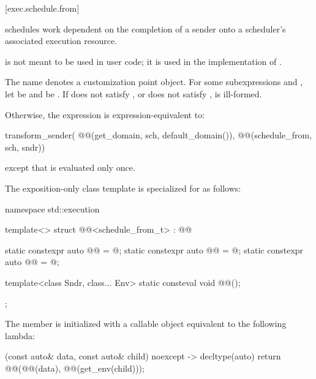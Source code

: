 [exec.schedule.from]{}

\pnum
{} schedules work dependent on the completion of a sender
onto a scheduler's associated execution resource.
\begin{note}
 is not meant to be used in user code;
it is used in the implementation of .
\end{note}

\pnum
The name  denotes a customization point object.
For some subexpressions  and ,
let  be  and
 be .
If  does not satisfy , or
 does not satisfy ,
 is ill-formed.

\pnum
Otherwise,
the expression  is expression-equivalent to:
\begin{codeblock}
transform_sender(
  @@(get_domain, sch, default_domain()),
  @@(schedule_from, sch, sndr))
\end{codeblock}
except that  is evaluated only once.

\pnum
The exposition-only class template 
is specialized for  as follows:
%
\begin{codeblock}
namespace std::execution {
  template<>
  struct @@<schedule_from_t> : @@ {
    static constexpr auto @@ = @\seebelow@;
    static constexpr auto @@ = @\seebelow@;
    static constexpr auto @@ = @\seebelow@;

    template<class Sndr, class... Env>
      static consteval void @@();
  };
}
\end{codeblock}

\pnum
The member 
is initialized with a callable object equivalent to the following lambda:
\begin{codeblock}
[](const auto& data, const auto& child) noexcept -> decltype(auto) {
  return @@(@@(data), @@(get_env(child)));
}
\end{codeblock}

